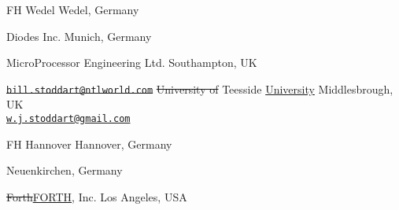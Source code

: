 \cbstart
{}
	{}
	{FH Wedel}
	{Wedel, Germany}
\cbend

	{}
	{Diodes Inc.}
	{Munich, Germany}

	{}
	{MicroProcessor Engineering Ltd.}
	{Southampton, UK}

\cbstart
{}
	{\sout{\texttt{bill.stoddart@ntlworld.com}}}
	{\sout{University of} Teesside \uline{University}}
	{Middlesbrough, UK}\\
\uline{\texttt{w.j.stoddart@gmail.com}}
\cbend

	{}
	{FH Hannover}
	{Hannover, Germany}

	{}
	{}
	{Neuenkirchen, Germany}

\cbstart
{}
	{}
	{\sout{Forth}\uline{FORTH}, Inc.}
	{Los Angeles, USA}
\cbend
